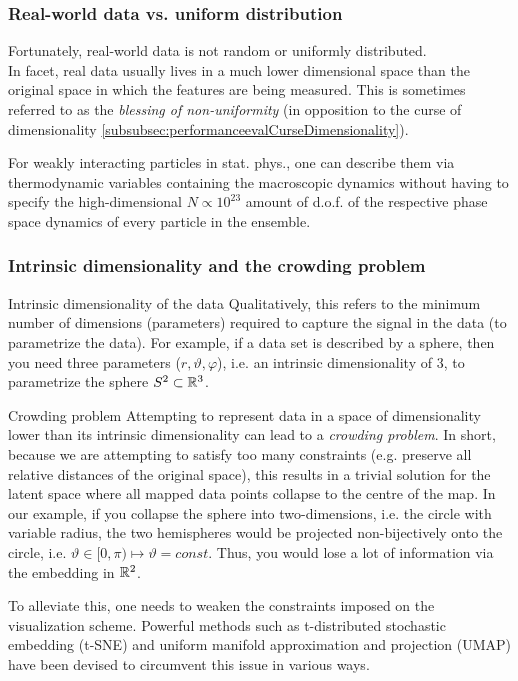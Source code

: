 \subsubsection{Real-world data vs. uniform distribution}
Fortunately, real-world data is not random or uniformly distributed.\\
In facet, real data usually lives in a much lower dimensional space than the original space in which the features are being measured. This is sometimes referred to as the \emph{blessing of non-uniformity} (in opposition to the curse of dimensionality \ref{subsubsec:performanceevalCurseDimensionality}). 
\begin{example}
	For weakly interacting particles in stat. phys., one can describe them via thermodynamic variables containing the macroscopic dynamics without having to specify the high-dimensional $N\propto 10^{23}$ amount of d.o.f. of the respective phase space dynamics of every particle in the ensemble.
\end{example}

\subsubsection{Intrinsic dimensionality and the crowding problem}
\begin{mybox}{Intrinsic dimensionality of the data}
	Qualitatively, this refers to the minimum number of dimensions (parameters) required to capture the signal in the data (to parametrize the data).  For example, if a data set is described by a sphere, then you need three parameters ($r,\vartheta,\varphi$), i.e. an intrinsic dimensionality of $3$, to parametrize the sphere $S^2 \subset \mathbb{R}^3$.
\end{mybox}
\begin{mybox}{Crowding problem}
	Attempting to represent data in a space of dimensionality lower than its intrinsic dimensionality can lead to a \emph{crowding problem}. In short, because we are attempting to satisfy too many constraints (e.g. preserve all relative distances of the original space), this results in a trivial solution for the latent space where all mapped data points collapse to the centre of the map. In our example, if you collapse the sphere into two-dimensions, i.e. the circle with variable radius, the two hemispheres would be projected non-bijectively onto the circle, i.e. $\vartheta\in [0,\pi)\mapsto \vartheta=const$. Thus, you would lose a lot of information via the embedding in $\mathbb{R}^2$.
\end{mybox}
To alleviate this, one needs to weaken the constraints imposed on the visualization scheme. Powerful methods such as t-distributed stochastic embedding (t-SNE) and uniform manifold approximation and projection (UMAP) have been devised to circumvent this issue in various ways.


